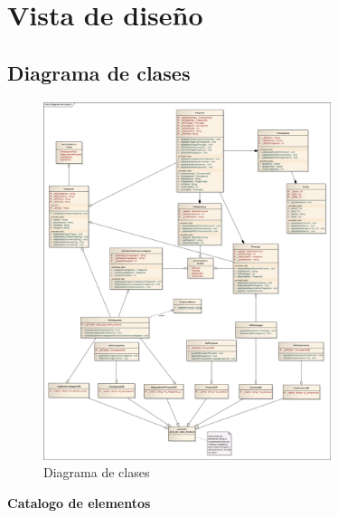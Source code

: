 \documentclass[12pt,oneside,letterpaper]{report}
\begin{document}
\section{Vista de diseño}

\subsection{Diagrama de clases}

\begin{figure}[h!]
  \centering
    \includegraphics[width=0.75\textwidth]{./img/img7.png}
  \caption{Diagrama de clases}
\end{figure}


\textbf{Catalogo de elementos}\\
\end{document}
